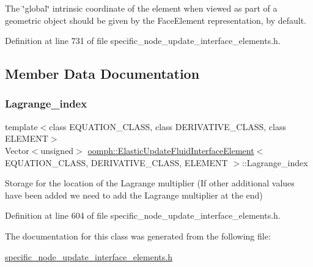 The \char`\"{}global\char`\"{} intrinsic coordinate of the element when viewed as part of a geometric object should be given by the Face\+Element representation, by default. 



Definition at line 731 of file specific\+\_\+node\+\_\+update\+\_\+interface\+\_\+elements.\+h.



\subsection{Member Data Documentation}
\mbox{\label{classoomph_1_1ElasticUpdateFluidInterfaceElement_a7852050a89e3aac51ed3693814be9018}} 
\subsubsection{\texorpdfstring{Lagrange\+\_\+index}{Lagrange\_index}}
{\footnotesize\ttfamily template$<$class E\+Q\+U\+A\+T\+I\+O\+N\+\_\+\+C\+L\+A\+SS, class D\+E\+R\+I\+V\+A\+T\+I\+V\+E\+\_\+\+C\+L\+A\+SS, class E\+L\+E\+M\+E\+NT$>$ \\
Vector$<$unsigned$>$ \hyperlink{classoomph_1_1ElasticUpdateFluidInterfaceElement}{oomph\+::\+Elastic\+Update\+Fluid\+Interface\+Element}$<$ E\+Q\+U\+A\+T\+I\+O\+N\+\_\+\+C\+L\+A\+SS, D\+E\+R\+I\+V\+A\+T\+I\+V\+E\+\_\+\+C\+L\+A\+SS, E\+L\+E\+M\+E\+NT $>$\+::Lagrange\+\_\+index\hspace{0.3cm}{\ttfamily [private]}}



Storage for the location of the Lagrange multiplier (If other additional values have been added we need to add the Lagrange multiplier at the end) 



Definition at line 604 of file specific\+\_\+node\+\_\+update\+\_\+interface\+\_\+elements.\+h.



The documentation for this class was generated from the following file\+:\begin{DoxyCompactItemize}
\item 
\hyperlink{specific__node__update__interface__elements_8h}{specific\+\_\+node\+\_\+update\+\_\+interface\+\_\+elements.\+h}\end{DoxyCompactItemize}
